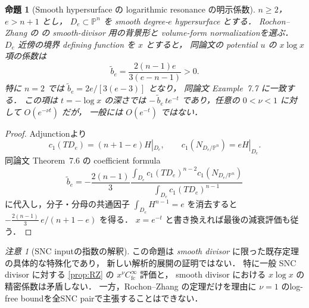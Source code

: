 \documentclass[11pt,a4paper]{ltjsarticle}
\newcommand{\PP}{\mathbb P}
\theoremstyle{plain}
\newtheorem{proposition}[proposition]{命題}
\theoremstyle{definition}
\theoremstyle{remark}
\newtheorem{remark}[remark]{注意}
\begin{document}
\begin{proposition}[Smooth hypersurface の logarithmic resonance の明示係数]
\label{prop:RZ-smooth-hypersurface-coefficient}
$n\ge2$，$e>n+1$ とし，
$D_e\subset\PP^n$ を smooth degree-$e$ hypersurface とする．
Rochon--Zhang の \cite[Theorems~7.4 and~7.6]{RochonZhang} の
smooth-divisor 用の背景形と volume-form normalizationを選ぶ．
$D_e$ 近傍の境界 defining function を $x$ とすると，
同論文の potential $u$ の $x\log x$ 項の係数は
\[
 \boxed{\widetilde b_e
 =\frac{2(n-1)e}{3(e-n-1)}>0.}
\]
特に $n=2$ では $\widetilde b_e=2e/[3(e-3)]$ となり，
同論文 Example~7.7 に一致する．
この項は $t=-\log x$ の深さでは $-\,\widetilde b_e\,t e^{-t}$
であり，任意の $0<\nu<1$ に対して $O(e^{-\nu t})$ だが，
一般には $O(e^{-t})$ ではない．
\end{proposition}
\begin{proof}
Adjunctionより
\[
 c_1(TD_e)=(n+1-e)H|_{D_e},\qquad
 c_1(N_{D_e/\PP^n})=eH|_{D_e}.
\]
同論文 Theorem~7.6 の coefficient formula
\[
 \widetilde b_e
 =-\frac{2(n-1)}3
 \frac{\int_{D_e}c_1(TD_e)^{n-2}c_1(N_{D_e/\PP^n})}
      {\int_{D_e}c_1(TD_e)^{n-1}}
\]
に代入し，分子・分母の共通因子
$\int_{D_e}H^{n-1}=e$ を消去すると
$-\frac{2(n-1)}3\,e/(n+1-e)$ を得る．
$x=e^{-t}$ と書き換えれば最後の減衰評価も従う．
\end{proof}

\begin{remark}[SNC inputの指数の解釈]
この命題は \emph{smooth divisor} に限った既存定理の具体的な特殊化であり，
新しい解析的展開の証明ではない．
特に一般 SNC divisor に対する
\cref{prop:RZ} の $x^\nu C^\infty_{\mathrm{fc}}$ 評価と，
smooth divisor における $x\log x$ の精密係数は矛盾しない．
一方，Rochon--Zhang の定理だけを理由に
$\nu=1$ のlog-free boundを全SNC pairで主張することはできない．
\end{remark}
\end{document}
